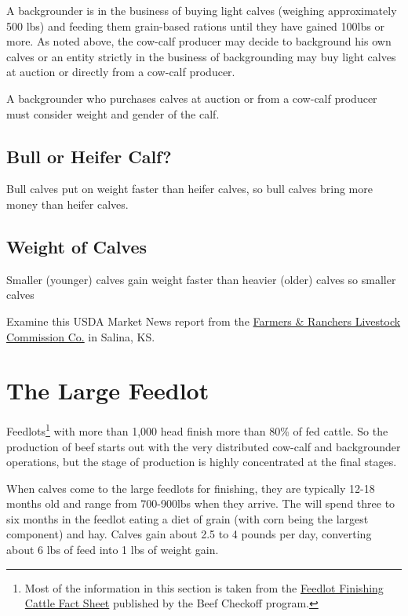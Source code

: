 \documentclass[]{book}
\let\rmarkdownfootnote\footnote%
\def\footnote{\protect\rmarkdownfootnote}
\theoremstyle{definition}
\theoremstyle{definition}
\theoremstyle{remark}
\begin{document}
A backgrounder is in the business of buying light calves (weighing
approximately 500 lbs) and feeding them grain-based rations until they
have gained 100lbs or more. As noted above, the cow-calf producer may
decide to background his own calves or an entity strictly in the
business of backgrounding may buy light calves at auction or directly
from a cow-calf producer.

A backgrounder who purchases calves at auction or from a cow-calf
producer must consider weight and gender of the calf.

\subsection{Bull or Heifer Calf?}\label{bull-or-heifer-calf}

Bull calves put on weight faster than heifer calves, so bull calves
bring more money than heifer calves.

\subsection{Weight of Calves}\label{weight-of-calves}

Smaller (younger) calves gain weight faster than heavier (older) calves
so smaller calves

Examine this USDA Market News report from the
\href{http://www.ams.usda.gov/mnreports/dc_ls143.txt}{Farmers \&
Ranchers Livestock Commission Co.} in Salina, KS.

\section{The Large Feedlot}\label{the-large-feedlot}

Feedlots\footnote{Most of the information in this section is taken from
  the
  \href{http://www.beefusa.org/uDocs/Feedlot\%20finishing\%20fact\%20sheet\%20FINAL_4\%2026\%2006.pdf}{Feedlot
  Finishing Cattle Fact Sheet} published by the Beef Checkoff program.}
with more than 1,000 head finish more than 80\% of fed cattle. So the
production of beef starts out with the very distributed cow-calf and
backgrounder operations, but the stage of production is highly
concentrated at the final stages.

When calves come to the large feedlots for finishing, they are typically
12-18 months old and range from 700-900lbs when they arrive. The will
spend three to six months in the feedlot eating a diet of grain (with
corn being the largest component) and hay. Calves gain about 2.5 to 4
pounds per day, converting about 6 lbs of feed into 1 lbs of weight
gain.
\end{document}
